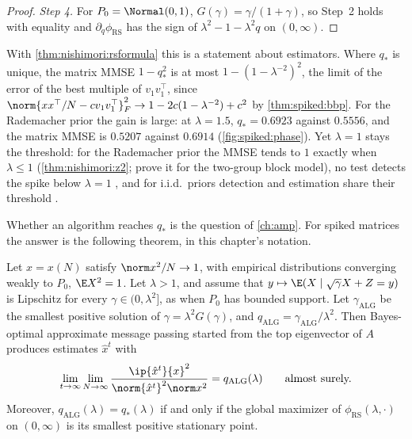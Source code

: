 \begin{refsection}
\begin{proof}
\emph{Step 4.} For $P_0=\Normal(0,1)$, $G(\gamma)=\gamma/(1+\gamma)$, so Step~2 holds with equality and $\partial_q\phi_{\mathrm{RS}}$ has the sign of $\lambda^2-1-\lambda^2q$ on $(0,\infty)$.
\end{proof}

With \cref{thm:nishimori:rsformula} this is a statement about estimators. Where $q_*$ is unique, the matrix MMSE $1-q_*^2$ is at most $1-(1-\lambda^{-2})^2$, the limit of the error of the best multiple of $v_1v_1^\top$, since $\norm{xx^\top/N-cv_1v_1^\top}_F^2\to1-2c(1-\lambda^{-2})+c^2$ by \cref{thm:spiked:bbp}. For the Rademacher prior the gain is large: at $\lambda=1.5$, $q_*=0.6923$ against $0.5556$, and the matrix MMSE is $0.5207$ against $0.6914$ (\cref{fig:spiked:phase}). Yet $\lambda=1$ stays the threshold: for the Rademacher prior the MMSE tends to $1$ exactly when $\lambda\le1$ (\cref{thm:nishimori:z2}; \textcite[Theorem~1.4 of arXiv v1]{DeshpandeAbbeMontanari2016} prove it for the two-group block model), no test detects the spike below $\lambda=1$ \parencite{PerryWeinBandeiraMoitra2018}, and for i.i.d.\ priors detection and estimation share their threshold \parencite{ElAlaouiKrzakalaJordan2020}.

Whether an algorithm reaches $q_*$ is the question of \cref{ch:amp}. For spiked matrices the answer is the following theorem, in this chapter's notation.

\begin{theorem}\label{thm:spiked:mv}
Let $x=x(N)$ satisfy $\norm x^2/N\to1$, with empirical distributions converging weakly to $P_0$, $\E X^2=1$. Let $\lambda>1$, and assume that $y\mapsto\E(X\mid\sqrt\gamma X+Z=y)$ is Lipschitz for every $\gamma\in(0,\lambda^2]$, as when $P_0$ has bounded support. Let $\gamma_{\mathrm{ALG}}$ be the smallest positive solution of $\gamma=\lambda^2G(\gamma)$, and $q_{\mathrm{ALG}}=\gamma_{\mathrm{ALG}}/\lambda^2$. Then Bayes-optimal approximate message passing started from the top eigenvector of $A$ produces estimates $\hat x^t$ with
\[
\lim_{t\to\infty}\lim_{N\to\infty}\frac{\ip{\hat x^t}{x}^2}{\norm{\hat x^t}^2\norm x^2}=q_{\mathrm{ALG}}(\lambda)\qquad\text{almost surely.}
\]
Moreover, $q_{\mathrm{ALG}}(\lambda)=q_*(\lambda)$ if and only if the global maximizer of $\phi_{\mathrm{RS}}(\lambda,\cdot)$ on $(0,\infty)$ is its smallest positive stationary point.
\end{theorem}


\end{refsection}

